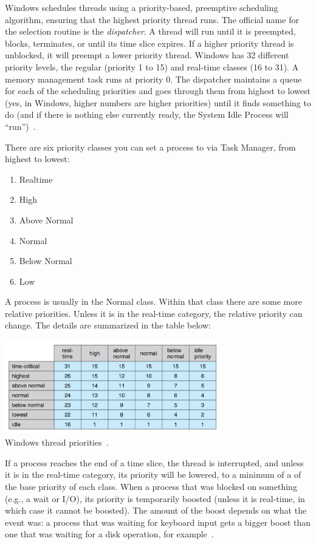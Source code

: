 Windows schedules threads using a priority-based, preemptive scheduling algorithm, ensuring that the highest priority thread runs. The official name for the selection routine is the \textit{dispatcher}. A thread will run until it is preempted, blocks, terminates, or until its time slice expires. If a higher priority thread is unblocked, it will preempt a lower priority thread. Windows has 32 different priority levels, the regular (priority 1 to 15) and real-time classes (16 to 31). A memory management task runs at priority 0. The dispatcher maintains a queue for each of the scheduling priorities and goes through them from highest to lowest (yes, in Windows, higher numbers are higher priorities) until it finds something to do (and if there is nothing else currently ready, the System Idle Process will ``run'')~\cite{osc}.

There are six priority classes you can set a process to via Task Manager, from highest to lowest:
\begin{enumerate}
	\item Realtime
	\item High
	\item Above Normal
	\item Normal
	\item Below Normal
	\item Low
\end{enumerate}

A process is usually in the Normal class. Within that class there are some more relative priorities. Unless it is in the real-time category, the relative priority can change. The details are summarized in the table below:

\begin{center}
	\includegraphics[width=0.7\textwidth]{images/windows-thread-priorities.png}\\
	Windows thread priorities~\cite{osc}.
\end{center}

If a process reaches the end of a time slice, the thread is interrupted, and unless it is in the real-time category, its priority will be lowered, to a minimum of a of the base priority of each class. When a process that was blocked on something (e.g., a wait or I/O), its priority is temporarily boosted (unless it is real-time, in which case it cannot be boosted). The amount of the boost depends on what the event was: a process that was waiting for keyboard input gets a bigger boost than one that was waiting for a disk operation, for example~\cite{osc}. 

